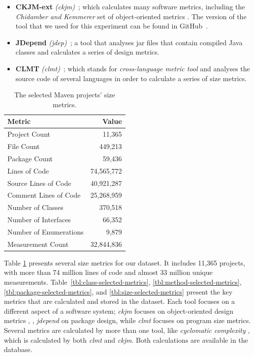 \documentclass[conference]{IEEEtran}
\begin{document}
\begin{itemize}
  \item \textbf{CKJM-ext} \textit{(ckjm)}~\cite{Spi05g}; which calculates many software metrics, including the \textit{Chidamber and Kemmerer} set of object-oriented metrics \cite{CHKE94}. The version of the tool that we used for this experiment can be found in GitHub~\cite{CKJM}.

  \item \textbf{JDepend} \textit{(jdep)}~\cite{JDEPEND}; a tool that analyses {\sc jar} files that contain compiled Java classes and calculates a series of design metrics.

  \item \textbf{CLMT} \textit{(clmt)}~\cite{SGKL09}; which stands for \textit{cross-language metric tool} and analyses the source code of several languages in order to calculate a series of size metrics.
\end{itemize}

\begin{table}[!t]
\caption{The selected Maven projects' size metrics.}
\label{tbl:oss-size-metrics}
\centering
\begin{tabular}{|l||r|}
 \hline
\textbf{Metric} & \textbf{Value}\\
\hline
Project Count & 11,365\\
\hline
File Count & 449,213\\
\hline
Package Count & 59,436\\
\hline
Lines of Code & 74,565,772\\
\hline
Source Lines of Code & 40,921,287\\
\hline
Comment Lines of Code & 25,268,959\\
\hline
Number of Classes & 370,518\\
\hline
Number of Interfaces & 66,352\\
\hline
Number of Enumerations & 9,879\\
\hline
Measurement Count & 32,844,836\\
\hline
\end{tabular}
\end{table}

Table \ref{tbl:oss-size-metrics} presents several size metrics for our dataset. It includes 11,365 projects, with more than 74 million lines of code and almost 33 million unique measurements. Table~\ref{tbl:class-selected-metrics}, \ref{tbl:method-selected-metrics}, \ref{tbl:package-selected-metrics}, and \ref{tbl:size-selected-metrics} present the key metrics that are calculated and stored in the dataset. Each tool focuses on a different aspect of a software system; \textit{ckjm} focuses on object-oriented design metrics \cite{LOKI94}, \cite{CHKE94}, \textit{jdepend} on package design, while \textit{clmt} focuses on program size metrics. Several metrics are calculated by more than one tool, like \textit{cyclomatic complexity} \cite{cabe76}, which is calculated by both \textit{clmt} and \textit{ckjm}. Both calculations are available in the database.
\end{document}
